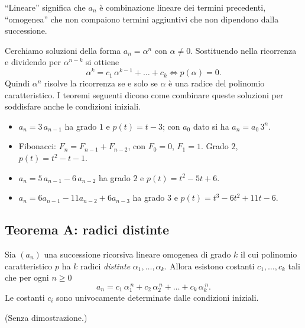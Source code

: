 \documentclass[11pt,a4paper]{article}
\begin{document}
``Lineare'' significa che $a_n$ è combinazione lineare dei termini precedenti,
``omogenea'' che non compaiono termini aggiuntivi che non dipendono dalla
successione.

\begin{osservazione}
Cerchiamo soluzioni della forma $a_n = \alpha^n$ con $\alpha \neq 0$.
Sostituendo nella ricorrenza e dividendo per $\alpha^{n-k}$ si ottiene
\[
  \alpha^k = c_1\, \alpha^{k-1} + \dots + c_k
  \iff p(\alpha) = 0 .
\]
Quindi $\alpha^n$ risolve la ricorrenza se e solo se $\alpha$ è una radice del
polinomio caratteristico. I teoremi seguenti dicono come combinare queste
soluzioni per soddisfare anche le condizioni iniziali.
\end{osservazione}

\begin{esempio}
\begin{itemize}
  \item $a_n = 3\, a_{n-1}$ ha grado $1$ e $p(t) = t - 3$; con $a_0$ dato si ha
        $a_n = a_0\, 3^n$.
  \item Fibonacci: $F_n = F_{n-1} + F_{n-2}$, con $F_0 = 0$, $F_1 = 1$. Grado
        $2$, $p(t) = t^2 - t - 1$.
  \item $a_n = 5\, a_{n-1} - 6\, a_{n-2}$ ha grado $2$ e
        $p(t) = t^2 - 5t + 6$.
  \item $a_n = 6 a_{n-1} - 11 a_{n-2} + 6 a_{n-3}$ ha grado $3$ e
        $p(t) = t^3 - 6t^2 + 11t - 6$.
\end{itemize}
\end{esempio}

\subsection{Teorema A: radici distinte}

\begin{teorema}[A]
Sia $(a_n)$ una successione ricorsiva lineare omogenea di grado $k$ il cui
polinomio caratteristico $p$ ha $k$ radici \emph{distinte}
$\alpha_1, \dots, \alpha_k$. Allora esistono costanti
$c_1, \dots, c_k$ tali che per ogni $n \geq 0$
\[
  a_n = c_1\, \alpha_1^{\,n} + c_2\, \alpha_2^{\,n} + \dots + c_k\, \alpha_k^{\,n} .
\]
Le costanti $c_i$ sono univocamente determinate dalle condizioni iniziali.
\end{teorema}

(Senza dimostrazione.)
\end{document}
